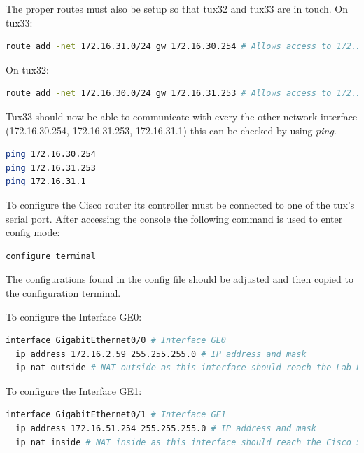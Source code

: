 \documentclass[a4paper,11pt,english]{article}
\begin{document}
            \noindent The proper routes must also be setup so that tux32 and tux33 are in touch.
            On tux33:

\begin{lstlisting}[language=sh]
route add -net 172.16.31.0/24 gw 172.16.30.254 # Allows access to 172.16.31.X through tux34 (172.16.30.254)
\end{lstlisting}

            On tux32:

\begin{lstlisting}[language=sh]
route add -net 172.16.30.0/24 gw 172.16.31.253 # Allows access to 172.16.30.X through tux34 (172.16.31.253)
\end{lstlisting}

            Tux33 should now be able to communicate with every the other network interface 
            (172.16.30.254, 172.16.31.253, 172.16.31.1) this can be checked by using 
            \textit{ping}.

\begin{lstlisting}[language=sh]
ping 172.16.30.254
ping 172.16.31.253
ping 172.16.31.1
\end{lstlisting}


            To configure the Cisco router its controller must be connected to one of the
            tux's serial port. After accessing the console the following command is used to
            enter config mode:

\begin{lstlisting}[language=sh]
configure terminal
\end{lstlisting}

            The configurations found in the config file %
            should be adjusted and then copied to the configuration terminal.

            To configure the Interface GE0:

\begin{lstlisting}[language=sh]
interface GigabitEthernet0/0 # Interface GE0
  ip address 172.16.2.59 255.255.255.0 # IP address and mask
  ip nat outside # NAT outside as this interface should reach the Lab Router
\end{lstlisting}

            To configure the Interface GE1:
\begin{lstlisting}[language=sh]
interface GigabitEthernet0/1 # Interface GE1
  ip address 172.16.51.254 255.255.255.0 # IP address and mask
  ip nat inside # NAT inside as this interface should reach the Cisco Switch
\end{lstlisting}
\end{document}
